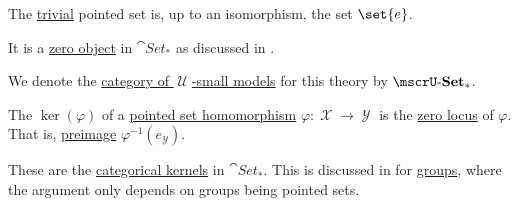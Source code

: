 \begin{definition}
\begin{thmenum}
     The \hyperref[thm:substructures_form_complete_lattice/bottom]{trivial} pointed set is, up to an isomorphism, the set \( \set{ e } \).

    It is a \hyperref[def:universal_objects/initial]{zero object} in \( \cat{Set_*} \) as discussed in .

     We denote the \hyperref[def:category_of_small_first_order_models]{category of \( \mscrU \)-small models} for this theory by \( \ucat{Set}_* \).
  \end{thmenum}
\end{definition}

\begin{definition}\label{def:pointed_set_kernel}\mimprovised
  The  \( \ker(\varphi) \) of a \hyperref[def:pointed_set/homomorphism]{pointed set homomorphism} \( \varphi: \mscrX \to \mscrY \) is the \hyperref[def:zero_locus]{zero locus} of \( \varphi \). That is, \hyperref[thm:def:function/properties/preimage]{preimage} \( \varphi^{-1}(e_\mscrY) \).

  These are the \hyperref[def:zero_morphisms/kernel]{categorical kernels} in \hyperref[def:pointed_set/category]{\( \cat{Set_*} \)}. This is discussed in  for \hyperref[def:group]{groups}, where the argument only depends on groups being pointed sets.
\end{definition}


